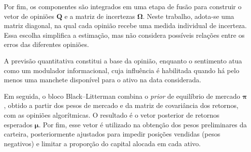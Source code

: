 Por fim, os componentes são integrados em uma etapa de fusão
para construir o vetor de opiniões $\boldsymbol{Q}$ e a matriz
de incertezas $\boldsymbol{\Omega}$. Neste trabalho, adota-se
uma matriz diagonal, na qual cada opinião recebe uma medida
individual de incerteza. Essa escolha simplifica a estimação,
mas não considera possíveis relações entre os erros das
diferentes opiniões.

A previsão quantitativa constitui a base da opinião, enquanto o sentimento atua como um modulador informacional, cuja influência é habilitada quando há pelo menos uma manchete disponível para o ativo na data considerada.

Em seguida, o bloco Black--Litterman combina o \textit{prior}
de equilíbrio de mercado $\boldsymbol{\pi}$, obtido a partir
dos pesos de mercado e da matriz de covariância dos retornos,
com as opiniões algorítmicas. O resultado é o vetor posterior
de retornos esperados $\boldsymbol{\mu}$. Por fim, esse vetor
é utilizado na obtenção dos pesos preliminares da carteira,
posteriormente ajustados para impedir posições vendidas
(pesos negativos) e limitar a proporção do capital alocada
em cada ativo.
